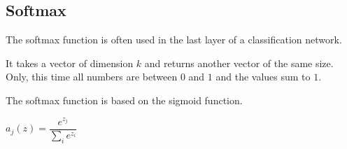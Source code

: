 
\subsection{Softmax}

The softmax function is often used in the last layer of a classification network.

It takes a vector of dimension \(k\) and returns another vector of the same size. Only, this time all numbers are between \(0\) and \(1\) and the values sum to \(1\).

The softmax function is based on the sigmoid function.

\(a_j(z)=\dfrac{e^{z_j}}{\sum_{i}e^{z_i}}\)

